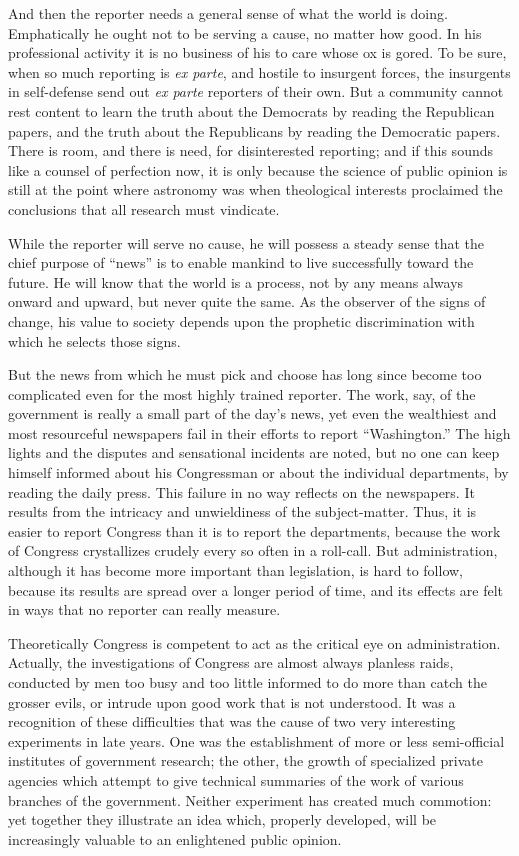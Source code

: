 \documentclass[openany,nobib,twoside,nohyper]{tufte-book}
\begin{document}
And then the reporter needs a general sense of what the world is doing.
Emphatically he ought not to be serving a cause, no matter how good. In
his professional activity it is no business of his to care whose ox is
gored. To be sure, when so much reporting is \emph{ex parte}, and
hostile to insurgent forces, the insurgents in self-defense send out
\emph{ex parte} reporters of their own. But a community cannot rest
content to learn the truth about the Democrats by reading the Republican
papers, and the truth about the Republicans by reading the Democratic
papers. There is room, and there is need, for disinterested reporting;
and if this sounds like a counsel of perfection now, it is only because
the science of public opinion is still at the point where astronomy was
when theological interests proclaimed the conclusions that all research
must vindicate.

While the reporter will serve no cause, he will possess a steady sense
that the chief purpose of ``news'' is to enable mankind to live
successfully toward the future. He will know that the world is a
process, not by any means always onward and upward, but never quite the
same. As the observer of the signs of change, his value to society
depends upon the prophetic discrimination with which he selects those
signs.

But the news from which he must pick and choose has long since become
too complicated even for the most highly trained reporter. The work,
say, of the government is really a small part of the day's news, yet
even the wealthiest and most resourceful newspapers fail in their
efforts to report ``Washington.'' The high lights and the disputes and
sensational incidents are noted, but no one can keep himself informed
about his Congressman or about the individual departments, by reading
the daily press. This failure in no way reflects on the newspapers. It
results from the intricacy and unwieldiness of the subject-matter. Thus,
it is easier to report Congress than it is to report the departments,
because the work of Congress crystallizes crudely every so often in a
roll-call. But administration, although it has become more important
than legislation, is hard to follow, because its results are spread over
a longer period of time, and its effects are felt in ways that no
reporter can really measure.

Theoretically Congress is competent to act as the critical eye on
administration. Actually, the investigations of Congress are almost
always planless raids, conducted by men too busy and too little informed
to do more than catch the grosser evils, or intrude upon good work that
is not understood. It was a recognition of these difficulties that was
the cause of two very interesting experiments in late years. One was the
establishment of more or less semi-official institutes of government
research; the other, the growth of specialized private agencies which
attempt to give technical summaries of the work of various branches of
the government. Neither experiment has created much commotion: yet
together they illustrate an idea which, properly developed, will be
increasingly valuable to an enlightened public opinion.
\end{document}
